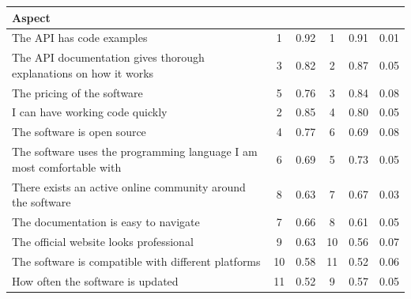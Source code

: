 \documentclass{article}
\begin{document}
\begin{table}[H]
\centering
\begin{tabularx}{\columnwidth}{X|c:c|c:c|c}

\textbf{Aspect}                                                    &     & &   & & \\ \hline
The API has code examples                                             &         1 & 0.92             &               1 & 0.91             & 0.01  \\ \hline
The API documentation gives thorough explanations on how it works     &         3 & 0.82             &               2 & 0.87             & 0.05  \\ \hline
The pricing of the software                                           &         5 & 0.76             &               3 & 0.84             & 0.08  \\ \hline
I can have working code quickly                                       &         2 & 0.85             &               4 & 0.80             & 0.05  \\ \hline
The software is open source                                           &         4 & 0.77             &               6 & 0.69             & 0.08  \\ \hline
The software uses the programming language I am most comfortable with &         6 & 0.69             &               5 & 0.73             & 0.05  \\ \hline
There exists an active online community around the software           &         8 & 0.63             &               7 & 0.67             & 0.03  \\ \hline
The documentation is easy to navigate                                 &         7 & 0.66             &               8 & 0.61             & 0.05  \\ \hline
The official website looks professional                               &         9 & 0.63             &              10 & 0.56             & 0.07  \\ \hline
The software is compatible with different platforms                   &        10 & 0.58             &              11 & 0.52             & 0.06  \\ \hline
How often the software is updated                                     &        11 & 0.52             &               9 & 0.57             & 0.05  \\ \hline

\end{tabularx}
\end{table}
\end{document}
